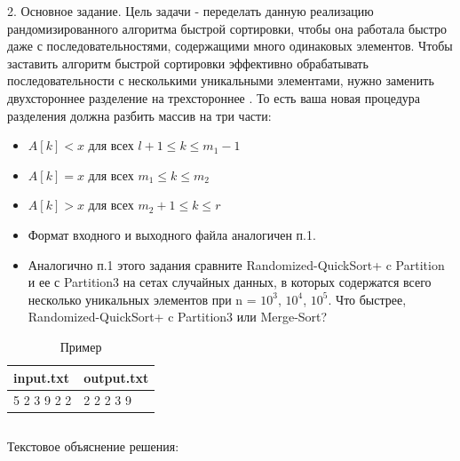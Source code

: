 2. Основное задание. Цель задачи - переделать данную реализацию рандомизированного алгоритма быстрой сортировки, чтобы она работала быстро даже с последовательностями, содержащими много одинаковых элементов. Чтобы заставить алгоритм быстрой сортировки эффективно обрабатывать последовательности с несколькими уникальными элементами, нужно заменить двухстороннее разделение на трехстороннее \cite{alg}. То есть ваша новая процедура разделения должна разбить массив на три части:
\begin{itemize}
    \item $A[k] < x$ для всех $l + 1 \le k \le m_1 − 1$
    \item $A[k] = x$ для всех $m_1 \le  k \le m_2$
    \item $A[k] > x$ для всех $m_2 + 1 \le k \le r$
    \item Формат входного и выходного файла аналогичен п.1.
    \item Аналогично п.1 этого задания сравните Randomized-QuickSort+ c
    Partition и ее с Partition3 на сетах случайных данных, в которых
    содержатся всего несколько уникальных элементов при n = $10^3$, $10^4$, $10^5$. Что быстрее, Randomized-QuickSort+ c Partition3 или Merge-Sort?
\end{itemize}
\begin{table}[H]
    \caption{Пример}
	\begin{center}
		\begin{tabular}{|l|l|}
			\hline
			  input.txt  &  output.txt \\ \hline
			    5 2 3 9 2 2  &  2 2 2 3 9 \\ \hline
		\end{tabular}
		\label{tabular:tab_examp_2}
	\end{center}
\end{table}

\begin{code}
	\inputminted[breaklines=true, xleftmargin=1em, linenos, frame=single, framesep=10pt, fontsize=\footnotesize, firstline=1, lastline=54]{haskell}{listings/1.py}
	\caption{Код первой задачи}
\end{code}
Текстовое объяснение решения:

